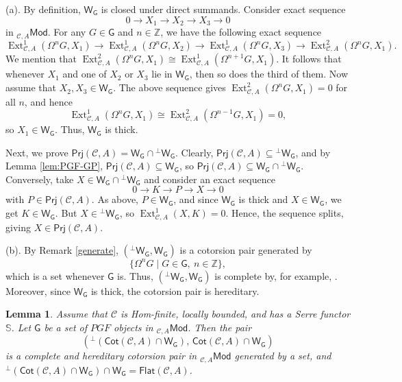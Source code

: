 \documentclass{amsart}
\theoremstyle{bfupright head,slanted body}
\theoremstyle{bfupright head,upright body}
\theoremstyle{fixed bf head,slanted body}
\newtheorem{lem}[res]{Lemma}            \newtheorem*{lem*}{Lemma}
\theoremstyle{fixed bf head,upright body}
\theoremstyle{numbered paragraph}
\newenvironment{prf*}[1][Proof]{%
	\begin{proof}[\bf #1]
		\setcounter{equation}{0}
		\renewcommand{\theequation}{\arabic{equation}}}
	{\end{proof}
}
\numberwithin{equation}{res}
\newcommand{\Flat}[1]{\mathsf{Flat}(#1)}
\newcommand{\Cot}[1]{\mathsf{Cot}(#1)}
\newcommand{\Mod}[1]{{_{#1}\mathsf{Mod}}}
\newcommand{\Prj}[1]{\mathsf{Prj}(#1)}
\newcommand{\Ext}[4][]{\operatorname{Ext}_{#1}^{#2}(#3,#4)}
\newcommand{\G}{\mathsf{G}}
\newcommand{\WG}{\mathsf{W}_{\mathsf{G}}}
\newcommand{\C}{\mathcal{C}}
\begin{document}
\begin{prf*}
(a). By definition, $\WG$ is closed under direct summands.
Consider exact sequence
\[0\to X_{1}\to X_{2}\to X_{3}\to 0\]
in $\Mod{\C,A}$.
For any $G\in \G$ and $n\in \mathbb{Z}$, we have the following exact sequence
\[\Ext[\C,A]{1}{\Omega^{n}G}{X_{1}}\to \Ext[\C,A]{1}{\Omega^{n}G}{X_{2}}\to \Ext[\C,A]{1}{\Omega^{n}G}{X_{3}}\to \Ext[\C,A]{2}{\Omega^{n}G}{X_{1}}.\]
We mention that $\Ext[\C,A]{2}{\Omega^{n}G}{X_{1}}\cong \Ext[\C,A]{1}{\Omega^{n+1}G}{X_{1}}$.
It follows that whenever $X_{1}$ and one of $X_{2}$ or $X_{3}$ lie in $\WG$, then so does the third of them.
Now assume that $X_{2}, X_{3}\in \WG$.
The above sequence gives $\Ext[\C,A]{2}{\Omega^{n}G}{X_{1}}=0$ for all $n$, and hence
\[\Ext[\C,A]{1}{\Omega^{n}G}{X_{1}}\cong\Ext[\C,A]{2}{\Omega^{n-1}G}{X_{1}}=0,\]
so $X_1\in\WG$. Thus, $\WG$ is thick.

Next, we prove $\Prj{\C,A}=\WG\cap {^{\bot}\WG}$. Clearly, $\Prj{\C,A}\subseteq{^{\bot}\WG}$, and by Lemma \ref{lem:PGF-GP}, $\Prj{\C,A}\subseteq\WG$, so $\Prj{\C,A}\subseteq\WG\cap {^{\bot}\WG}$. Conversely, take $X\in \WG\cap {^{\bot}\WG}$ and consider an exact sequence
$$0\to K\to P\to X\to 0$$
with $P\in\Prj{\C,A}$. As above, $P\in\WG$, and since $\WG$ is thick and $X\in\WG$, we get $K\in\WG$. But $X\in{^{\bot}\WG}$, so $\Ext[\C,A]{1}{X}{K}=0$. Hence, the sequence splits, giving $X\in\Prj{\C,A}$.

(b). By Remark \ref{generate}, $(^{\bot}\WG,\WG)$ is a cotorsion pair generated by
\[\{\Omega^{n}G\mid G\in\G,\ n\in\mathbb{Z}\},\]
which is a set whenever $\G$ is. Thus, $(^{\bot}\WG,\WG)$ is complete by, for example, \cite[Theorem 6.11(b)]{RT12}. Moreover, since $\WG$ is thick, the cotorsion pair is hereditary.
\end{prf*}

\begin{lem}\label{flat cotorsion pair}
Assume that $\C$ is Hom-finite, locally bounded, and has a Serre functor $\mathbb{S}$. Let $\G$ be a set of $PGF$ objects in $\Mod{\C,A}$. Then the pair
\[(^{\perp}(\Cot{\C,A}\cap\WG), \, \Cot{\C,A}\cap\WG)\]
is a complete and hereditary cotorsion pair in $\Mod{\C,A}$ generated by a set, and $^{\perp}(\Cot{\C,A}\cap\WG)\cap\WG=\Flat{\C,A}$.
\end{lem}
\end{document}
